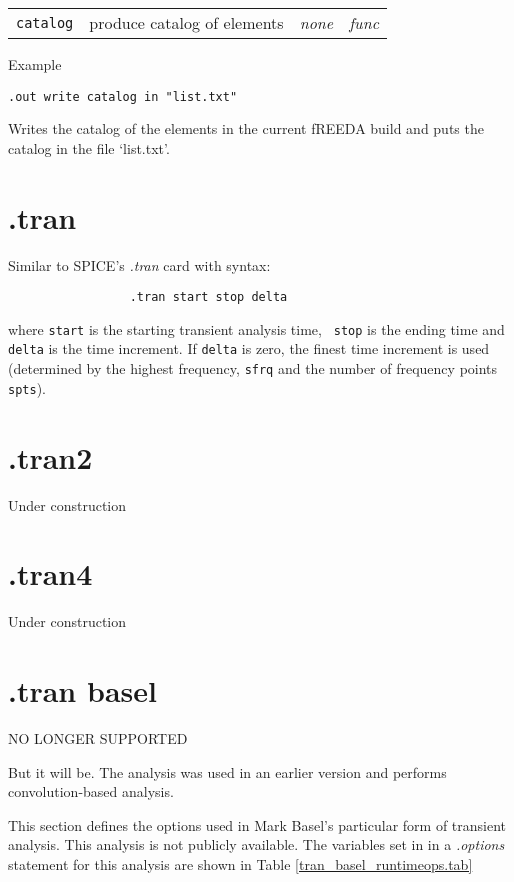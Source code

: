 \bigskip
\begin{tabular}{p{.8in}p{2.5in}p{1.0in}p{.75in}}
{\tt catalog} & produce catalog of elements &
  {\it none} & {\it func}
\end{tabular}

\noindent Example

\begin{verbatim}
.out write catalog in "list.txt"
\end{verbatim}
Writes the catalog of the elements in the current fREEDA build and
puts the catalog in the file `list.txt'.

\clearpage
\section{.tran}

Similar to SPICE's {\em .tran} card with syntax:
\begin{tt}
\begin{verbatim}
                 .tran start stop delta
\end{verbatim}
\end{tt}
where {\tt start} is the starting transient analysis time, {\tt
stop} is the ending time and {\tt delta} is the time increment. If
{\tt delta} is zero, the finest time increment is used (determined
by the highest frequency, {\tt sfrq} and the number of frequency
points {\tt spts}).

\section{.tran2}

Under construction

\section{.tran4}

Under construction

\clearpage
\section{.tran basel}

NO LONGER SUPPORTED

But it will be.  The analysis was used in an earlier version and performs convolution-based analysis.

This section defines the options used in Mark Basel's particular
form of transient analysis.  This analysis is not publicly
available.  The variables set in in a {\em .options} statement for
this analysis are shown in Table \ref{tran_basel_runtimeops.tab}

